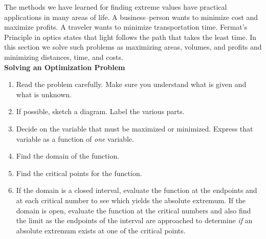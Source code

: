 \documentclass{book}
\begin{document}
The methods we have learned for finding extreme values have practical applications in many areas of life. A business--person wants to minimize cost and maximize profits. A traveler wants to minimize transportation time. Fermat's Principle in optics states that light follows the path that takes the least time. In this section we solve such problems as maximizing areas, volumes, and profits and minimizing distances, time, and costs.\\

\textbf{Solving an Optimization Problem}
\begin{enumerate}
\item Read the problem carefully. Make sure you understand what is given and what is unknown.

\item If possible, sketch a diagram. Label the various parts.

\item Decide on the variable that must be maximized or minimized. Express that variable as a function of \emph{one} variable.

\item Find the domain of the function. 

\item Find the critical points for the function.

\item If the domain is a closed interval, evaluate the function at the endpoints and at each critical number to see which yields the absolute extremum. If the domain is open, evaluate the function at the critical numbers and also find the limit as the endpoints of the interval are approached to determine \emph{if} an absolute extremum exists at one of the critical points.
\end{enumerate}\vs
\end{document}
